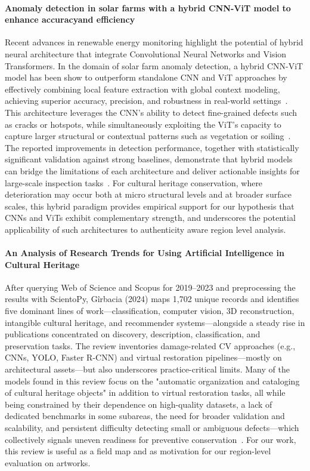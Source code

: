 \documentclass[conference]{IEEEtran}
\begin{document}
\paragraph*{Anomaly detection in solar farms with a hybrid CNN-ViT model to enhance accuracyand efficiency}
Recent advances in renewable energy monitoring highlight the potential of hybrid neural architecture that integrate Convolutional Neural Networks and Vision Transformers. In the domain of solar farm anomaly detection, a hybrid CNN-ViT model has been show to outperform standalone CNN and ViT approaches by effectively combining local feature extraction with global context modeling, achieving superior accuracy, precision, and robustness in real-world settings~\cite{darban_anomaly_2025}. This architecture leverages the CNN's ability to detect fine-grained defects such as cracks or hotspots, while simultaneously exploiting the ViT's capacity to capture larger structural or contextual patterns such as vegetation or soiling~\cite{darban_anomaly_2025}. The reported improvements in detection performance, together with statistically significant validation against strong baselines, demonstrate that hybrid models can bridge the limitations of each architecture and deliver actionable insights for large-scale inspection tasks~\cite{darban_anomaly_2025}. For cultural heritage conservation, where deterioration may occur both at micro structural levels and at broader surface scales, this hybrid paradigm provides empirical support for our hypothesis that CNNs and ViTs exhibit complementary strength, and underscores the potential applicability of such architectures to authenticity aware region level analysis.


\medskip
\paragraph*{An Analysis of Research Trends for Using Artificial Intelligence in Cultural Heritage}

After querying Web of Science and Scopus for 2019–2023 and preprocessing the results with ScientoPy, Gîrbacia (2024) maps 1,702 unique records and identifies five dominant lines of work—classification, computer vision, 3D reconstruction, intangible cultural heritage, and recommender systems—alongside a steady rise in publications concentrated on discovery, description, classification, and preservation tasks. The review inventories damage-related CV approaches (e.g., CNNs, YOLO, Faster R-CNN) and virtual restoration pipelines—mostly on architectural assets—but also underscores practice-critical limits. Many of the models found in this review focus on the "automatic organization and cataloging of cultural heritage objects" in addition to virtual restoration tasks, all while being constrained by their dependence on high-quality datasets, a lack of dedicated benchmarks in some subareas, the need for broader validation and scalability, and persistent difficulty detecting small or ambiguous defects—which collectively signals uneven readiness for preventive conservation~\cite{girbacia_analysis_2024}. For our work, this review is useful as a field map and as motivation for our region-level evaluation on artworks. 
\end{document}
